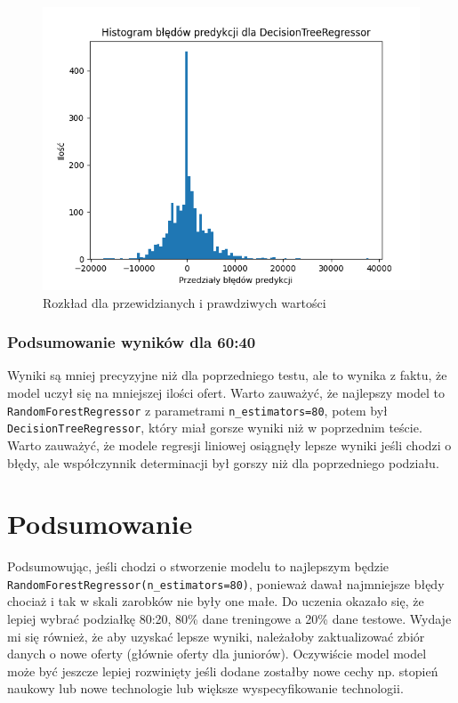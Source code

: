 \documentclass[a4paper]{article}
\begin{document}
\begin{figure}[H]
    \centering
    \includegraphics[width=\textwidth]{../analysis/plots/wyniki/0.6&0.4/DecisionTreeRegressor/errors.png}
    \caption{Rozkład dla przewidzianych i prawdziwych wartości}
\end{figure}

\subsubsection{Podsumowanie wyników dla 60:40}


\quad Wyniki są mniej precyzyjne niż dla poprzedniego testu, ale to wynika z faktu, że model uczył się na mniejszej
ilości ofert. Warto zauważyć, że najlepszy model to \texttt{RandomForestRegressor} z parametrami \texttt{n\_estimators=80},
potem był \texttt{DecisionTreeRegressor}, który miał gorsze wyniki niż w poprzednim teście. Warto zauważyć, że modele regresji liniowej osiągnęły lepsze wyniki jeśli chodzi o błędy, ale współczynnik determinacji był gorszy niż dla poprzedniego podziału.

\section{Podsumowanie}
\quad Podsumowując, jeśli chodzi o stworzenie modelu to najlepszym będzie \newline \texttt{RandomForestRegressor(n\_estimators=80)},
ponieważ dawał najmniejsze błędy chociaż i tak w skali zarobków nie były one małe.
Do uczenia okazało się, że lepiej wybrać podziałkę 80:20, 80\% dane treningowe a 20\% dane testowe. Wydaje mi się również, że aby uzyskać lepsze wyniki,
należałoby zaktualizować zbiór danych o nowe oferty (głównie oferty dla juniorów).
Oczywiście model model może być jeszcze lepiej rozwinięty jeśli dodane zostałby nowe cechy np. stopień naukowy lub nowe technologie lub większe wyspecyfikowanie technologii.
\end{document}
